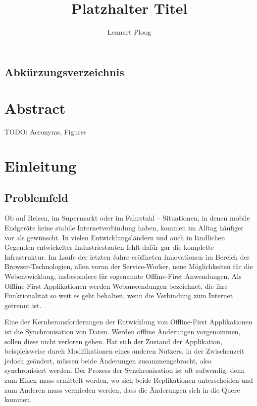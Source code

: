 \documentclass[a4paper, 12pt]{scrreprt}
\title{Platzhalter Titel}
\subtitle{}
\author{Lennart Ploog}
\begin{document}
	\maketitle
	\newpage
	\tableofcontents
	\newpage
\section*{Abkürzungsverzeichnis}
	\begin{acronym}[Bash]
	\end{acronym}
\chapter{Abstract}
TODO: Acronyms, Figures
\chapter{Einleitung}\label{sec:Einleitung}
\section{Problemfeld}\label{sec:Problemfeld}

Ob auf Reisen, im Supermarkt oder im Fahrstuhl -- Situationen, in denen mobile Endgeräte keine stabile Internetverbindung haben, kommen im Alltag häufiger vor als gewünscht. In vielen Entwicklungsländern und auch in ländlichen Gegenden entwickelter Industriestaaten fehlt dafür gar die komplette Infrastruktur. Im Laufe der letzten Jahre eröffneten Innovationen im Bereich der Browser-Technologien, allen voran der Service-Worker, neue Möglichkeiten für die Webentwicklung, insbesondere für sogenannte Offline-First Anwendungen. Als Offline-First Applikationen werden Webanwendungen bezeichnet, die ihre Funktionalität so weit es geht behalten, wenn die Verbindung zum Internet getrennt ist.

Eine der Kernherausforderungen der Entwicklung von Offline-First Applikationen ist die Synchronisation von Daten. Werden offline Änderungen vorgenommen, sollen diese nicht verloren gehen. Hat sich der Zustand der Applikation, beispielsweise durch Modifikationen eines anderen Nutzers, in der Zwischenzeit jedoch geändert, müssen beide Änderungen zusammengebracht, also synchronisiert werden. Der Prozess der Synchronisation ist oft aufwendig, denn zum Einen muss ermittelt werden, wo sich beide Replikationen unterscheiden und zum Anderen muss vermieden werden, dass die Änderungen sich in die Quere kommen. 
\end{document}
